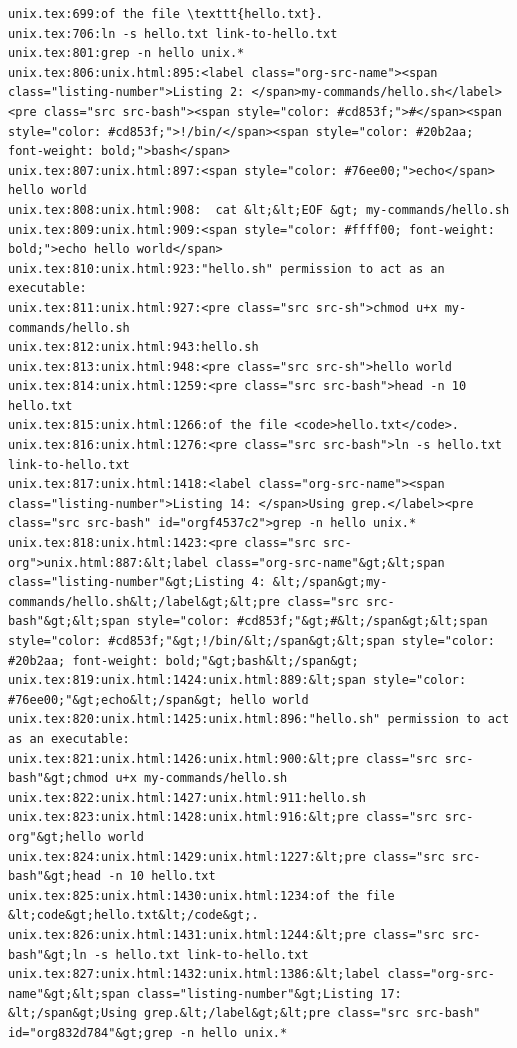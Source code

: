 \documentclass[11pt]{article}
\begin{document}
\begin{verbatim}
unix.tex:699:of the file \texttt{hello.txt}.
unix.tex:706:ln -s hello.txt link-to-hello.txt
unix.tex:801:grep -n hello unix.*
unix.tex:806:unix.html:895:<label class="org-src-name"><span class="listing-number">Listing 2: </span>my-commands/hello.sh</label><pre class="src src-bash"><span style="color: #cd853f;">#</span><span style="color: #cd853f;">!/bin/</span><span style="color: #20b2aa; font-weight: bold;">bash</span>
unix.tex:807:unix.html:897:<span style="color: #76ee00;">echo</span> hello world
unix.tex:808:unix.html:908:  cat &lt;&lt;EOF &gt; my-commands/hello.sh
unix.tex:809:unix.html:909:<span style="color: #ffff00; font-weight: bold;">echo hello world</span>
unix.tex:810:unix.html:923:"hello.sh" permission to act as an executable:
unix.tex:811:unix.html:927:<pre class="src src-sh">chmod u+x my-commands/hello.sh
unix.tex:812:unix.html:943:hello.sh
unix.tex:813:unix.html:948:<pre class="src src-sh">hello world
unix.tex:814:unix.html:1259:<pre class="src src-bash">head -n 10 hello.txt
unix.tex:815:unix.html:1266:of the file <code>hello.txt</code>.
unix.tex:816:unix.html:1276:<pre class="src src-bash">ln -s hello.txt link-to-hello.txt
unix.tex:817:unix.html:1418:<label class="org-src-name"><span class="listing-number">Listing 14: </span>Using grep.</label><pre class="src src-bash" id="orgf4537c2">grep -n hello unix.*
unix.tex:818:unix.html:1423:<pre class="src src-org">unix.html:887:&lt;label class="org-src-name"&gt;&lt;span class="listing-number"&gt;Listing 4: &lt;/span&gt;my-commands/hello.sh&lt;/label&gt;&lt;pre class="src src-bash"&gt;&lt;span style="color: #cd853f;"&gt;#&lt;/span&gt;&lt;span style="color: #cd853f;"&gt;!/bin/&lt;/span&gt;&lt;span style="color: #20b2aa; font-weight: bold;"&gt;bash&lt;/span&gt;
unix.tex:819:unix.html:1424:unix.html:889:&lt;span style="color: #76ee00;"&gt;echo&lt;/span&gt; hello world
unix.tex:820:unix.html:1425:unix.html:896:"hello.sh" permission to act as an executable:
unix.tex:821:unix.html:1426:unix.html:900:&lt;pre class="src src-bash"&gt;chmod u+x my-commands/hello.sh
unix.tex:822:unix.html:1427:unix.html:911:hello.sh
unix.tex:823:unix.html:1428:unix.html:916:&lt;pre class="src src-org"&gt;hello world
unix.tex:824:unix.html:1429:unix.html:1227:&lt;pre class="src src-bash"&gt;head -n 10 hello.txt
unix.tex:825:unix.html:1430:unix.html:1234:of the file &lt;code&gt;hello.txt&lt;/code&gt;.
unix.tex:826:unix.html:1431:unix.html:1244:&lt;pre class="src src-bash"&gt;ln -s hello.txt link-to-hello.txt
unix.tex:827:unix.html:1432:unix.html:1386:&lt;label class="org-src-name"&gt;&lt;span class="listing-number"&gt;Listing 17: &lt;/span&gt;Using grep.&lt;/label&gt;&lt;pre class="src src-bash" id="org832d784"&gt;grep -n hello unix.*

\end{verbatim}
\end{document}
